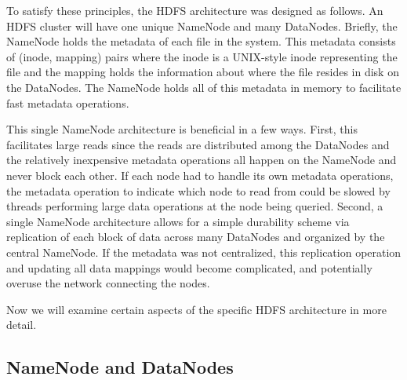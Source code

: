 \documentclass[11pt, a4paper]{article}
\begin{document}
\begin{multicols*}{2}
To satisfy these principles, the HDFS architecture was designed as follows. An HDFS cluster will have one unique NameNode and many DataNodes. Briefly, the NameNode holds the metadata of each file in the system. This metadata consists of (inode, mapping) pairs where the inode is a UNIX-style inode representing the file and the mapping holds the information about where the file resides in disk on the DataNodes. The NameNode holds all of this metadata in memory to facilitate fast metadata operations. 


This single NameNode architecture is beneficial in a few ways. First, this facilitates large reads since the reads are distributed among the DataNodes and the relatively inexpensive metadata operations all happen on the NameNode and never block each other. If each node had to handle its own metadata operations, the metadata operation to indicate which node to read from could be slowed by threads performing large data operations at the node being queried. Second, a single NameNode architecture allows for a simple durability scheme via replication of each block of data across many DataNodes and organized by the central NameNode. If the metadata was not centralized, this replication operation and updating all data mappings would become complicated, and potentially overuse the network connecting the nodes.

Now we will examine certain aspects of the specific HDFS architecture in more detail. 

\subsection{NameNode and DataNodes}



\end{multicols*}
\end{document}
